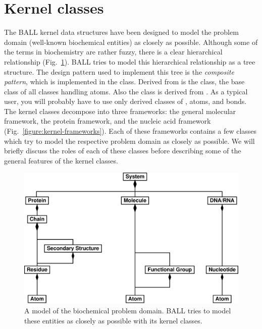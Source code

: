 \section{Kernel classes}
The BALL kernel data structures have been designed to model the problem 
domain (\ie well-known biochemical entities) as closely as possible.
Although some of the terms in biochemistry are rather fuzzy, there is a clear
hierarchical relationship (Fig.~\ref{figure:problem-domain}).
BALL tries to model this hierarchical relationship as a tree structure.
The design pattern used to implement this tree is the {\em composite
pattern}\cite{DesignPatterns}, which is implemented in the 
class. Derived from  is the  class, the
base class of all classes handling atoms. Also the  class is 
derived from . As a typical user, you will probably have to 
use only derived classes of , atoms, and bonds. The kernel
classes decompose into three frameworks: the general molecular framework, the 
protein framework, and the nucleic acid framework 
(Fig.~\ref{figure:kernel-frameworks}).
Each of these frameworks contains a few classes which try to model the
respective problem domain as closely as possible. We will briefly discuss the
roles of each of these classes before describing some of the general features
of the kernel classes.

\begin{figure}[tb]
  \centering\includegraphics[width=\textwidth]{problem-domain.eps}
  \caption{A model of the biochemical problem domain. BALL tries to model
           these entities as closely as possible with its kernel classes.}
  \label{figure:problem-domain}
\end{figure}

